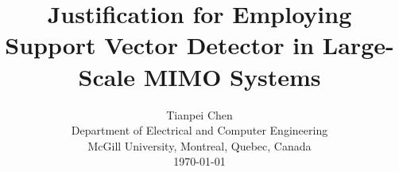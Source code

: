 \documentclass[10pt, draftclsnofoot, onecolumn]{IEEEtran}
\begin{document}
%
\title{Justification for Employing Support Vector Detector in Large-Scale MIMO Systems}
%
%
%



\author{Tianpei Chen\\
Department of Electrical and Computer Engineering\\
McGill University, Montreal, Quebec, Canada\\
\today}


% 
%
\end{document}
